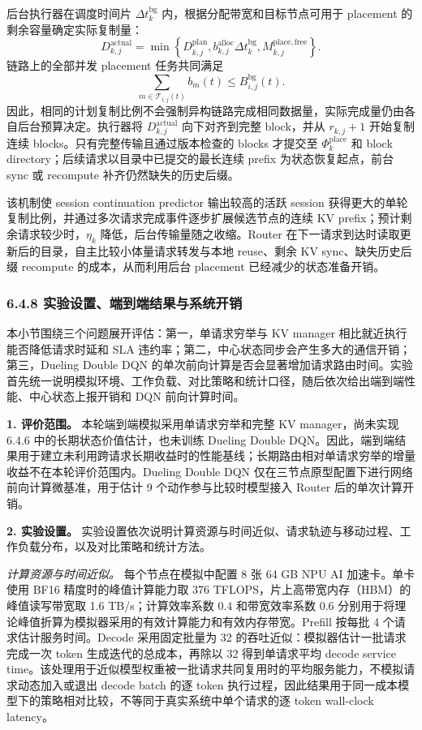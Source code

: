 后台执行器在调度时间片 \(\Delta t_k^{\mathrm{bg}}\) 内，根据分配带宽和目标节点可用于 placement 的剩余容量确定实际复制量：
\[
D_{k,j}^{\mathrm{actual}}
=
\min
\left\{
D_{k,j}^{\mathrm{plan}},
b_{k,j}^{\mathrm{alloc}}\Delta t_k^{\mathrm{bg}},
M_{k,j}^{\mathrm{place,free}}
\right\}.
\]
链路上的全部并发 placement 任务共同满足
\[
\sum_{m\in\mathcal T_{i,j}(t)}b_m(t)
\leq
B_{i,j}^{\mathrm{bg}}(t).
\]
因此，相同的计划复制比例不会强制异构链路完成相同数据量，实际完成量仍由各自后台预算决定。执行器将 \(D_{k,j}^{\mathrm{actual}}\) 向下对齐到完整 block，并从 \(r_{k,j}+1\) 开始复制连续 blocks。只有完整传输且通过版本检查的 blocks 才提交至 \(\Phi_k^{\mathrm{place}}\) 和 block directory；后续请求以目录中已提交的最长连续 prefix 为状态恢复起点，前台 sync 或 recompute 补齐仍然缺失的历史后缀。

该机制使 session continuation predictor 输出较高的活跃 session 获得更大的单轮复制比例，并通过多次请求完成事件逐步扩展候选节点的连续 KV prefix；预计剩余请求较少时，\(\eta_k\) 降低，后台传输量随之收缩。Router 在下一请求到达时读取更新后的目录，自主比较小体量请求转发与本地 reuse、剩余 KV sync、缺失历史后缀 recompute 的成本，从而利用后台 placement 已经减少的状态准备开销。

\subsubsection*{6.4.8 实验设置、端到端结果与系统开销}

本小节围绕三个问题展开评估：第一，单请求穷举与 KV manager 相比就近执行能否降低请求时延和 SLA 违约率；第二，中心状态同步会产生多大的通信开销；第三，Dueling Double DQN 的单次前向计算是否会显著增加请求路由时间。实验首先统一说明模拟环境、工作负载、对比策略和统计口径，随后依次给出端到端性能、中心状态上报开销和 DQN 前向计算时间。

\medskip
\noindent\textbf{1. 评价范围。}
本轮端到端模拟采用单请求穷举和完整 KV manager，尚未实现 6.4.6 中的长期状态价值估计，也未训练 Dueling Double DQN。因此，端到端结果用于建立未利用跨请求长期收益时的性能基线；长期路由相对单请求穷举的增量收益不在本轮评价范围内。Dueling Double DQN 仅在三节点原型配置下进行网络前向计算微基准，用于估计 9 个动作参与比较时模型接入 Router 后的单次计算开销。

\medskip
\noindent\textbf{2. 实验设置。}
实验设置依次说明计算资源与时间近似、请求轨迹与移动过程、工作负载分布，以及对比策略和统计方法。

\noindent\textit{计算资源与时间近似。}
每个节点在模拟中配置 8 张 64 GB NPU AI 加速卡。单卡使用 BF16 精度时的峰值计算能力取 376 TFLOPS，片上高带宽内存（HBM）的峰值读写带宽取 1.6 TB/s；计算效率系数 0.4 和带宽效率系数 0.6 分别用于将理论峰值折算为模拟器采用的有效计算能力和有效内存带宽。Prefill 按每批 4 个请求估计服务时间。Decode 采用固定批量为 32 的吞吐近似：模拟器估计一批请求完成一次 token 生成迭代的总成本，再除以 32 得到单请求平均 decode service time。该处理用于近似模型权重被一批请求共同复用时的平均服务能力，不模拟请求动态加入或退出 decode batch 的逐 token 执行过程，因此结果用于同一成本模型下的策略相对比较，不等同于真实系统中单个请求的逐 token wall-clock latency。


